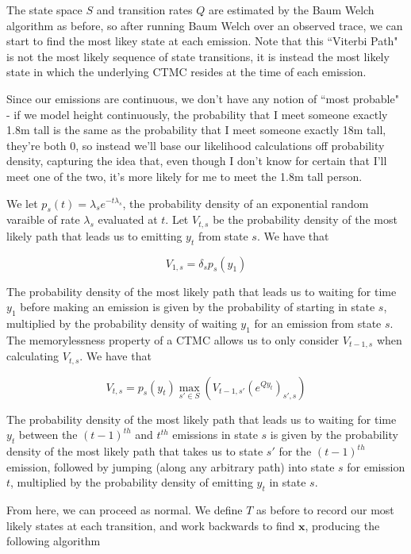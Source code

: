 The state space $S$ and transition rates $Q$ are estimated by the Baum Welch algorithm as before, so after running Baum Welch over an observed trace, we can start to find the most likey state at each emission. Note that this ``Viterbi Path" is not the most likely sequence of state transitions, it is instead the most likely state in which the underlying CTMC resides at the time of each emission. 

Since our emissions are continuous, we don't have any notion of ``most probable" - if we model height continuously, the probability that I meet someone exactly 1.8m tall is the same as the probability that I meet someone exactly 18m tall, they're both 0, so instead we'll base our likelihood calculations off probability density, capturing the idea that, even though I don't know for certain that I'll meet one of the two, it's more likely for me to meet the 1.8m tall person.

We let $p_s(t)= \lambda_s e^{-t\lambda_s}$, the probability density of an exponential random varaible of rate $\lambda_s$ evaluated at $t$. Let $V_{t,s}$ be the probability density of the most likely path that leads us to emitting $y_t$ from state $s$. We have that

$$
V_{1,s} =  \delta_{s}p_s(y_1)
$$

The probability density of the most likely path that leads us to waiting for time $y_1$ before making an emission is given by the probability of starting in state $s$, multiplied by the probability density of waiting $y_1$ for an emission from state $s$. The memorylessness property of a CTMC allows us to only consider $V_{t-1,s}$ when calculating $V_{t,s}$. We have that

$$
V_{t,s} = p_s(y_t) \max_{s'\in S} (V_{t-1,s'}(e^{Qy_t})_{s',s})
$$

The probability density of the most likely path that leads us to waiting for time $y_t$ between the $(t-1)^{th}$ and $t^{th}$ emissions in state $s$ is given by the probability density of the most likely path that takes us to state $s'$ for the $(t-1)^{th}$ emission, followed by jumping (along any arbitrary path) into state $s$ for emission $t$, multiplied by the probability density of emitting $y_t$ in state $s$.

From here, we can proceed as normal. We define $T$ as before to record our most likely states at each transition, and work backwards to find $\mathbf{x}$, producing the following algorithm

